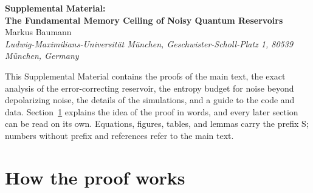 \documentclass[aps,prl,twocolumn,superscriptaddress,floatfix]{revtex4-2}
\theoremstyle{plain}
\begin{document}
\begin{center}
{\large\bfseries Supplemental Material:\\[3pt] The Fundamental Memory Ceiling of Noisy Quantum Reservoirs}\\[10pt]
Markus Baumann\\[3pt]
{\small\itshape Ludwig-Maximilians-Universit\"at M\"unchen, Geschwister-Scholl-Platz 1, 80539 M\"unchen, Germany}
\end{center}

This Supplemental Material contains the proofs of the main text, the exact analysis of the error-correcting reservoir, the entropy budget for noise beyond depolarizing noise, the details of the simulations, and a guide to the code and data. Section~\ref{sm:overview} explains the idea of the proof in words, and every later section can be read on its own. Equations, figures, tables, and lemmas carry the prefix S; numbers without prefix and references refer to the main text.

\let\addcontentsline\SMaddcontentsline
\tableofcontents
\vspace{8pt}

\section{How the proof works}
\label{sm:overview}
\end{document}
